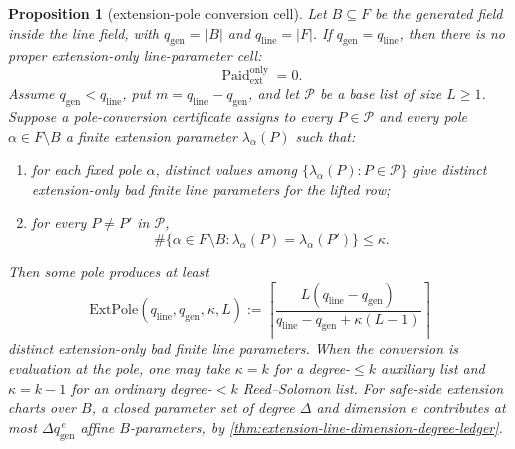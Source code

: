 \documentclass[11pt]{article}
\newtheorem{proposition}[proposition]{Proposition}
\theoremstyle{definition}
\theoremstyle{remark}
\providecommand{\Paid}{\operatorname{Paid}}
\begin{document}
\begin{proposition}[extension-pole conversion cell]\label{prop:capf-extension}
Let $B\subseteq F$ be the generated field inside the line field, with $q_{\mathrm{gen}}=|B|$ and $q_{\mathrm{line}}=|F|$.  If $q_{\mathrm{gen}}=q_{\mathrm{line}}$, then there is no proper extension-only line-parameter cell:
\[
        \Paid_{\mathrm{ext}}^{\mathrm{only}}=0.
\]
Assume $q_{\mathrm{gen}}<q_{\mathrm{line}}$, put $m=q_{\mathrm{line}}-q_{\mathrm{gen}}$, and let $\mathcal P$ be a base list of size $L\ge1$.  Suppose a pole-conversion certificate assigns to every $P\in\mathcal P$ and every pole $\alpha\in F\setminus B$ a finite extension parameter $\lambda_\alpha(P)$ such that:
\begin{enumerate}[label=\textup{(\roman*)}]
\item for each fixed pole $\alpha$, distinct values among $\{\lambda_\alpha(P):P\in\mathcal P\}$ give distinct extension-only bad finite line parameters for the lifted row;
\item for every $P\ne P'$ in $\mathcal P$,
\[
        \#\{\alpha\in F\setminus B:\lambda_\alpha(P)=\lambda_\alpha(P')\}\le \kappa .
\]
\end{enumerate}
Then some pole produces at least
\[
        \mathrm{ExtPole}(q_{\mathrm{line}},q_{\mathrm{gen}},\kappa,L)
        :=
        \left\lceil
        \frac{L(q_{\mathrm{line}}-q_{\mathrm{gen}})}
        {q_{\mathrm{line}}-q_{\mathrm{gen}}+\kappa(L-1)}
        \right\rceil
\]
distinct extension-only bad finite line parameters.  When the conversion is evaluation at the pole, one may take $\kappa=k$ for a degree-$\le k$ auxiliary list and $\kappa=k-1$ for an ordinary degree-$<k$ Reed--Solomon list.  For safe-side extension charts over $B$, a closed parameter set of degree $\Delta$ and dimension $e$ contributes at most $\Delta q_{\mathrm{gen}}^{\,e}$ affine $B$-parameters, by \cref{thm:extension-line-dimension-degree-ledger}.
\end{proposition}
\end{document}
